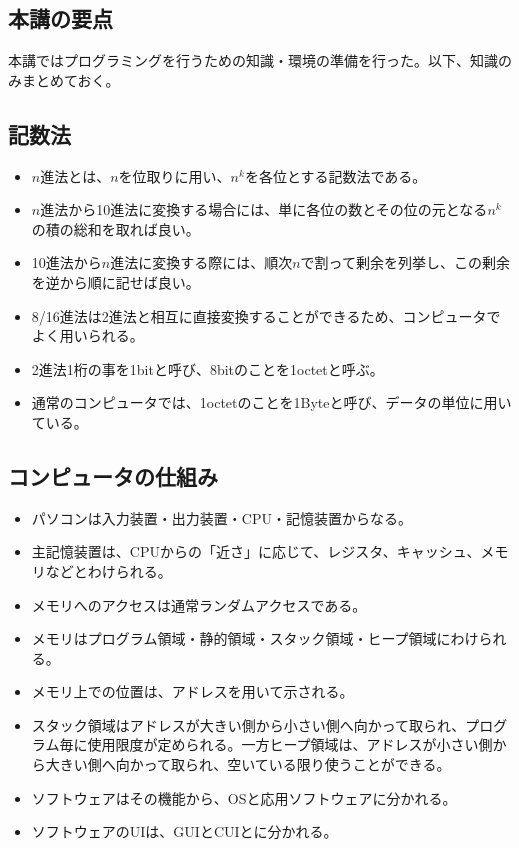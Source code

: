 \begin{shadebox}
\section*{本講の要点}
本講ではプログラミングを行うための知識・環境の準備を行った。以下、知識のみまとめておく。
\subsection*{記数法}
\begin{itemize}
\item $n$進法とは、$n$を位取りに用い、$n^k$を各位とする記数法である。
\item $n$進法から10進法に変換する場合には、単に各位の数とその位の元となる$n^k$の積の総和を取れば良い。
\item 10進法から$n$進法に変換する際には、順次$n$で割って剰余を列挙し、この剰余を逆から順に記せば良い。
\item 8/16進法は2進法と相互に直接変換することができるため、コンピュータでよく用いられる。
\item 2進法1桁の事を1bitと呼び、8bitのことを1octetと呼ぶ。
\item 通常のコンピュータでは、1octetのことを1Byteと呼び、データの単位に用いている。
\end{itemize}

\subsection*{コンピュータの仕組み}
\begin{itemize}
\item パソコンは入力装置・出力装置・CPU・記憶装置からなる。
\item 主記憶装置は、CPUからの「近さ」に応じて、レジスタ、キャッシュ、メモリなどとわけられる。
\item メモリへのアクセスは通常ランダムアクセスである。
\item メモリはプログラム領域・静的領域・スタック領域・ヒープ領域にわけられる。
\item メモリ上での位置は、アドレスを用いて示される。
\item スタック領域はアドレスが大きい側から小さい側へ向かって取られ、プログラム毎に使用限度が定められる。一方ヒープ領域は、アドレスが小さい側から大きい側へ向かって取られ、空いている限り使うことができる。
\item ソフトウェアはその機能から、OSと応用ソフトウェアに分かれる。
\item ソフトウェアのUIは、GUIとCUIとに分かれる。
\end{itemize}
\end{shadebox}
